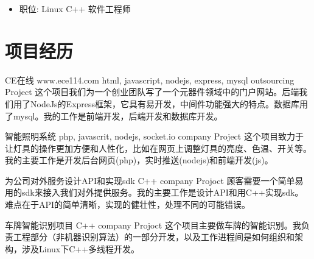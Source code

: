 \documentclass[11pt,a4paper]{moderncv}
\begin{document}
{
\begin{itemize}
\item 职位: Linux C++ 软件工程师
\end{itemize}
}


\section{项目经历}
{CE在线 www.ece114.com}
{html, javascript, nodejs, express, mysql}
{outsourcing Project}
{}
{
这个项目我们为一个创业团队写了一个元器件领域中的门户网站。后端我们用了NodeJs的Express框架，它具有易开发，中间件功能强大的特点。数据库用了mysql。我的工作是前端开发，后端开发和数据库开发。\\
}

\vspace*{0.2\baselineskip}
{智能照明系统}
{php, javascrit, nodejs, socket.io}
{company Project}
{}
{
这个项目致力于让灯具的操作更加方便和人性化，比如在网页上调整灯具的亮度、色温、开关等。我的主要工作是开发后台网页(php)，实时推送(nodejs)和前端开发(js)。\\
}

\vspace*{0.2\baselineskip}
{为公司对外服务设计API和实现sdk}
{C++}
{company Projoct}
{}
{
顾客需要一个简单易用的sdk来接入我们对外提供服务。我的主要工作是设计API和用C++实现sdk。难点在于API的简单清晰，实现的健壮性，处理不同的可能错误。\\
}

\vspace*{0.2\baselineskip}
{车牌智能识别项目}
{C++}
{company Projoct}
{}
{
这个项目主要做车牌的智能识别。我负责工程部分（非机器识别算法）的一部分开发，以及工作进程间是如何组织和架构，涉及Linux下C++多线程开发。\\
}


\end{document}
